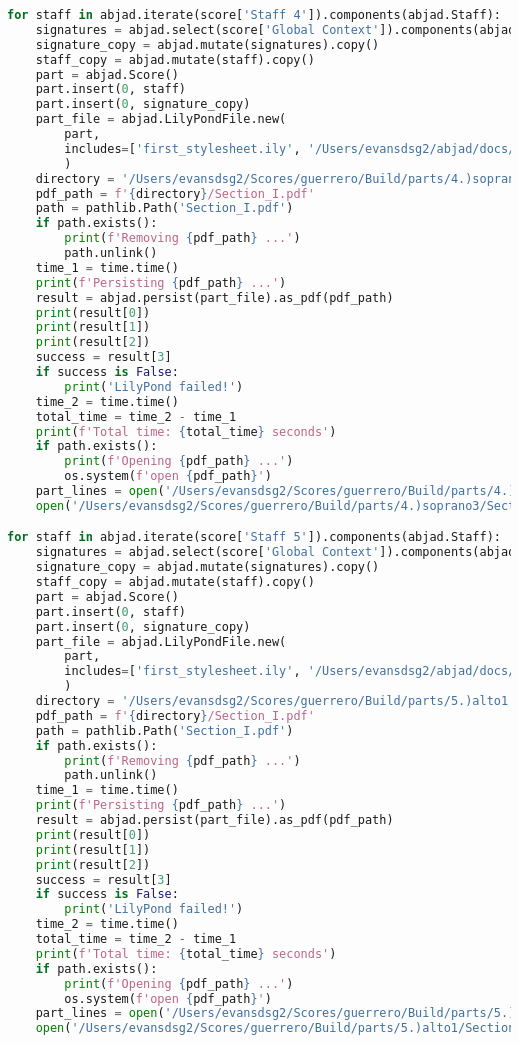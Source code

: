 \begin{lstlisting}[language=Python, caption=Invocation Source Code]
for staff in abjad.iterate(score['Staff 4']).components(abjad.Staff):
    signatures = abjad.select(score['Global Context']).components(abjad.Staff)
    signature_copy = abjad.mutate(signatures).copy()
    staff_copy = abjad.mutate(staff).copy()
    part = abjad.Score()
    part.insert(0, staff)
    part.insert(0, signature_copy)
    part_file = abjad.LilyPondFile.new(
        part,
        includes=['first_stylesheet.ily', '/Users/evansdsg2/abjad/docs/source/_stylesheets/abjad.ily'],
        )
    directory = '/Users/evansdsg2/Scores/guerrero/Build/parts/4.)soprano3'
    pdf_path = f'{directory}/Section_I.pdf'
    path = pathlib.Path('Section_I.pdf')
    if path.exists():
        print(f'Removing {pdf_path} ...')
        path.unlink()
    time_1 = time.time()
    print(f'Persisting {pdf_path} ...')
    result = abjad.persist(part_file).as_pdf(pdf_path)
    print(result[0])
    print(result[1])
    print(result[2])
    success = result[3]
    if success is False:
        print('LilyPond failed!')
    time_2 = time.time()
    total_time = time_2 - time_1
    print(f'Total time: {total_time} seconds')
    if path.exists():
        print(f'Opening {pdf_path} ...')
        os.system(f'open {pdf_path}')
    part_lines = open('/Users/evansdsg2/Scores/guerrero/Build/parts/4.)soprano3/Section_I.ly').readlines()
    open('/Users/evansdsg2/Scores/guerrero/Build/parts/4.)soprano3/Section_I.ly', 'w').writelines(part_lines[15:-1])

for staff in abjad.iterate(score['Staff 5']).components(abjad.Staff):
    signatures = abjad.select(score['Global Context']).components(abjad.Staff)
    signature_copy = abjad.mutate(signatures).copy()
    staff_copy = abjad.mutate(staff).copy()
    part = abjad.Score()
    part.insert(0, staff)
    part.insert(0, signature_copy)
    part_file = abjad.LilyPondFile.new(
        part,
        includes=['first_stylesheet.ily', '/Users/evansdsg2/abjad/docs/source/_stylesheets/abjad.ily'],
        )
    directory = '/Users/evansdsg2/Scores/guerrero/Build/parts/5.)alto1'
    pdf_path = f'{directory}/Section_I.pdf'
    path = pathlib.Path('Section_I.pdf')
    if path.exists():
        print(f'Removing {pdf_path} ...')
        path.unlink()
    time_1 = time.time()
    print(f'Persisting {pdf_path} ...')
    result = abjad.persist(part_file).as_pdf(pdf_path)
    print(result[0])
    print(result[1])
    print(result[2])
    success = result[3]
    if success is False:
        print('LilyPond failed!')
    time_2 = time.time()
    total_time = time_2 - time_1
    print(f'Total time: {total_time} seconds')
    if path.exists():
        print(f'Opening {pdf_path} ...')
        os.system(f'open {pdf_path}')
    part_lines = open('/Users/evansdsg2/Scores/guerrero/Build/parts/5.)alto1/Section_I.ly').readlines()
    open('/Users/evansdsg2/Scores/guerrero/Build/parts/5.)alto1/Section_I.ly', 'w').writelines(part_lines[15:-1])


\end{lstlisting}
